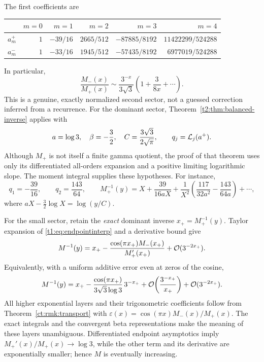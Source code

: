 \documentclass[11pt,openany]{book}
\numberwithin{equation}{chapter}
\theoremstyle{plain}
\theoremstyle{definition}
\theoremstyle{remark}
\begin{document}
The first coefficients are
\begin{center}
\begin{tabular}{c@{\qquad}rrrrr}
\toprule
 & $m=0$&$m=1$&$m=2$&$m=3$&$m=4$\\\midrule
$a_m^+$&$1$&$-39/16$&$2665/512$&$-87885/8192$&$11422299/524288$\\[2pt]
$a_m^-$&$1$&$-33/16$&$1945/512$&$-57435/8192$&$6977019/524288$\\\bottomrule
\end{tabular}
\end{center}
In particular,
\begin{equation}
 \frac{M_-(x)}{M_+(x)}
 \sim\frac{3^{-x}}{3\sqrt3}\left(1+\frac3{8x}+\cdots\right).
 \label{t2:eq:motzkin-ratio}
\end{equation}
This is a genuine, exactly normalized second sector, not a guessed correction inferred from a recurrence.
For the dominant sector, Theorem~\ref{t2:thm:balanced-inverse} applies with
\[
 a=\log3,\quad\beta=-\frac32,\quad C=\frac{3\sqrt3}{2\sqrt\pi},
 \qquad q_j=\mathcal L_j(a^+).
\]
Although $M_+$ is not itself a finite gamma quotient, the proof of that theorem uses only its differentiated all-orders expansion and a positive limiting logarithmic slope. The moment integral supplies these hypotheses. For instance,
\[
 q_1=-\frac{39}{16},\qquad q_2=\frac{143}{64},\qquad
 M_+^{-1}(y)=X+\frac{39}{16aX}
  +\frac1{X^2}\left(\frac{117}{32a^2}-\frac{143}{64a}\right)+\cdots,
\]
where $aX-\tfrac32\log X=\log(y/C)$.

For the small sector, retain the \emph{exact} dominant inverse $x_+=M_+^{-1}(y)$. Taylor expansion of \eqref{t1:eq:endpointinterp} and a derivative bound give
\begin{equation}
 M^{-1}(y)=x_+-\frac{\cos(\pi x_+)M_-(x_+)}{M_+'(x_+)}
                +\mathcal O(3^{-2x_+}).
 \label{t2:eq:motzkin-inverse-exact}
\end{equation}
Equivalently, with a uniform additive error even at zeros of the cosine,
\begin{equation}
 M^{-1}(y)=x_+-\frac{\cos(\pi x_+)}{3\sqrt3\log3}\,3^{-x_+}
 +\mathcal O\!\left(\frac{3^{-x_+}}{x_+}\right)
 +\mathcal O(3^{-2x_+}).
 \label{t2:eq:motzkin-inverse-leading}
\end{equation}
All higher exponential layers and their trigonometric coefficients follow from Theorem~\ref{ct:rmk:transport} with
$\varepsilon(x)=\cos(\pi x)M_-(x)/M_+(x)$. The exact integrals and the convergent beta representations make the meaning of these layers unambiguous. Differentiated endpoint asymptotics imply $M_+'(x)/M_+(x)\to\log3$, while the other term and its derivative are exponentially smaller; hence $M$ is eventually increasing.
\end{document}
